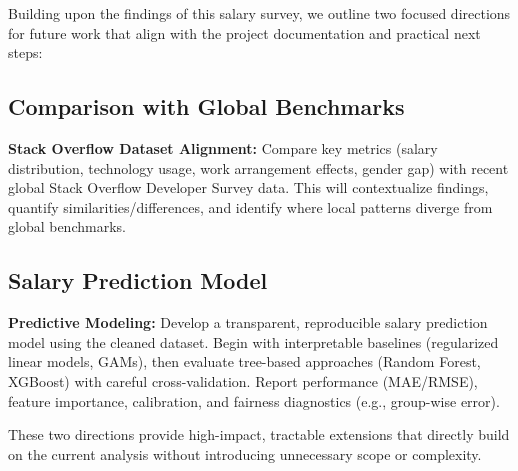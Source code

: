 Building upon the findings of this salary survey, we outline two focused directions for future work that align with the project documentation and practical next steps:

\subsection*{Comparison with Global Benchmarks}

\textbf{Stack Overflow Dataset Alignment:} Compare key metrics (salary distribution, technology usage, work arrangement effects, gender gap) with recent global Stack Overflow Developer Survey data. This will contextualize findings, quantify similarities/differences, and identify where local patterns diverge from global benchmarks.

\subsection*{Salary Prediction Model}

\textbf{Predictive Modeling:} Develop a transparent, reproducible salary prediction model using the cleaned dataset. Begin with interpretable baselines (regularized linear models, GAMs), then evaluate tree-based approaches (Random Forest, XGBoost) with careful cross-validation. Report performance (MAE/RMSE), feature importance, calibration, and fairness diagnostics (e.g., group-wise error).

These two directions provide high-impact, tractable extensions that directly build on the current analysis without introducing unnecessary scope or complexity.

